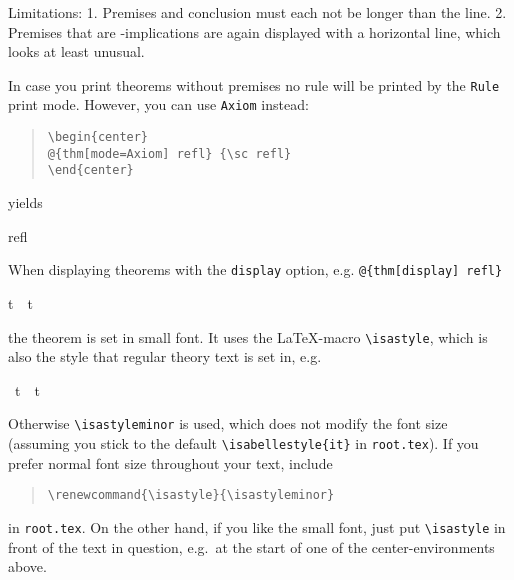 \begin{isabellebody}
\begin{isamarkuptext}
Limitations: 1. Premises and conclusion must each not be longer than
the line.  2. Premises that are -implications are again
displayed with a horizontal line, which looks at least unusual.


In case you print theorems without premises no rule will be printed by the
\texttt{Rule} print mode. However, you can use \texttt{Axiom} instead:
\begin{quote}
\verb!\begin{center}!\\
\verb!@!\verb!{thm[mode=Axiom] refl} {\sc refl}! \\
\verb!\end{center}!
\end{quote}
yields
\begin{center}
 {\sc refl} 
\end{center}%
\end{isamarkuptext}%
\isamarkuptrue%
%
\isamarkuptrue%
%
\begin{isamarkuptext}%
When displaying theorems with the \texttt{display} option, e.g.
\verb!@!\verb!{thm[display] refl}! \begin{isabelle}%
t\ {}\ t%
\end{isabelle} the theorem is
set in small font. It uses the \LaTeX-macro \verb!\isastyle!,
which is also the style that regular theory text is set in, e.g.%
\end{isamarkuptext}%
\isamarkuptrue%
\isamarkupfalse%
\ {}t\ {}\ t{}%
\isadelimproof
%
\endisadelimproof
%
\isatagproof
%
\endisatagproof
{\isafoldproof}%
%
\isadelimproof
%
\endisadelimproof
%
\begin{isamarkuptext}%
\noindent Otherwise \verb!\isastyleminor! is used,
which does not modify the font size (assuming you stick to the default
\verb!\isabellestyle{it}! in \texttt{root.tex}). If you prefer
normal font size throughout your text, include
\begin{quote}
\verb!\renewcommand{\isastyle}{\isastyleminor}!
\end{quote}
in \texttt{root.tex}. On the other hand, if you like the small font,
just put \verb!\isastyle! in front of the text in question,
e.g.\ at the start of one of the center-environments above.


\end{isamarkuptext}
\end{isabellebody}

